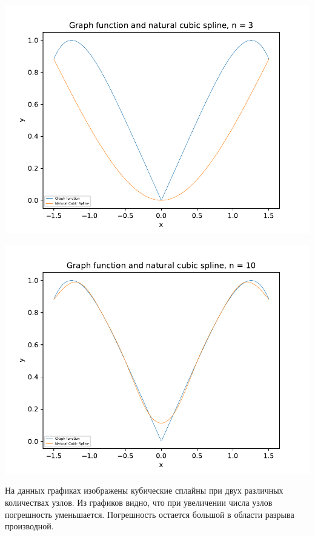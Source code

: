 \subsection{\begin{math}[-1.5;1.5]
\end{math}}

\includegraphics[scale=0.75]{1.pdf}

\includegraphics[scale=0.75]{2.pdf}

На данных графиках изображены кубические сплайны при двух различных количествах узлов. Из графиков видно, что при увеличении числа узлов погрешность уменьшается. Погрешность остается большой в области разрыва производной.


